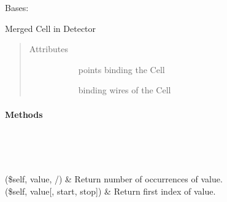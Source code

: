 \documentclass[letterpaper,10pt,english]{sphinxmanual}
\begin{document}
\begin{fulllineitems}
\label{\detokenize{dataTypes:dataTypes.Cell}}
Bases: 

Merged Cell in Detector
\begin{quote}\begin{description}
\item[{Attributes}] \leavevmode\begin{description}
\item[{{\hyperref[\detokenize{dataTypes:dataTypes.Cell.points}]{}}}] \leavevmode
points binding the Cell

\item[{{\hyperref[\detokenize{dataTypes:dataTypes.Cell.wires}]{}}}] \leavevmode
binding wires of the Cell

\end{description}

\end{description}\end{quote}
\paragraph{Methods}


\begin{savenotes}\sphinxatlongtablestart\begin{longtable}{}
\hline

\endfirsthead

%
{}\\
\hline

\endhead

\hline
{}\\
\endfoot

\endlastfoot

(\$self, value, /)
&
Return number of occurrences of value.
\\
\hline
{}(\$self, value{[}, start, stop{]})
&
Return first index of value.
\\
\hline
\end{longtable}\sphinxatlongtableend\end{savenotes}


\end{fulllineitems}
\end{document}
